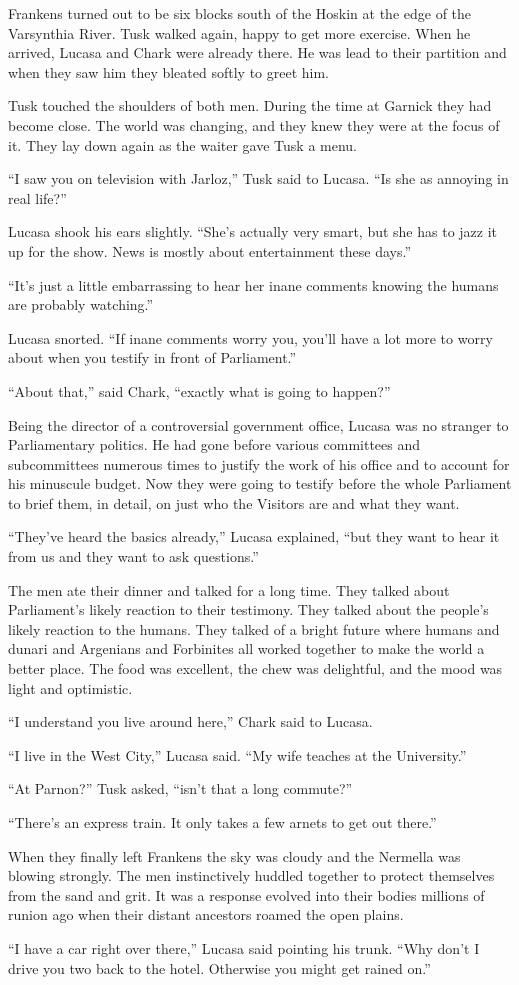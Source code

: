 Frankens turned out to be six blocks south of the Hoskin at the edge of the Varsynthia River.
Tusk walked again, happy to get more exercise. When he arrived, Lucasa and Chark were already
there. He was lead to their partition and when they saw him they bleated softly to greet him.

Tusk touched the shoulders of both men. During the time at Garnick they had become close. The
world was changing, and they knew they were at the focus of it. They lay down again as the
waiter gave Tusk a menu.

``I saw you on television with Jarloz,'' Tusk said to Lucasa. ``Is she as annoying in real
life?''

Lucasa shook his ears slightly. ``She's actually very smart, but she has to jazz it up for the
show. News is mostly about entertainment these days.''

``It's just a little embarrassing to hear her inane comments knowing the humans are probably
watching.''

Lucasa snorted. ``If inane comments worry you, you'll have a lot more to worry about when you
testify in front of Parliament.''

``About that,'' said Chark, ``exactly what is going to happen?''

Being the director of a controversial government office, Lucasa was no stranger to Parliamentary
politics. He had gone before various committees and subcommittees numerous times to justify the
work of his office and to account for his minuscule budget. Now they were going to testify
before the whole Parliament to brief them, in detail, on just who the Visitors are and what they
want.

``They've heard the basics already,'' Lucasa explained, ``but they want to hear it from us and
they want to ask questions.''

The men ate their dinner and talked for a long time. They talked about Parliament's likely
reaction to their testimony. They talked about the people's likely reaction to the humans. They
talked of a bright future where humans and dunari and Argenians and Forbinites all worked
together to make the world a better place. The food was excellent, the chew was delightful, and
the mood was light and optimistic.

``I understand you live around here,'' Chark said to Lucasa.

``I live in the West City,'' Lucasa said. ``My wife teaches at the University.''

``At Parnon?'' Tusk asked, ``isn't that a long commute?''

``There's an express train. It only takes a few arnets to get out there.''

When they finally left Frankens the sky was cloudy and the Nermella was blowing strongly. The
men instinctively huddled together to protect themselves from the sand and grit. It was a
response evolved into their bodies millions of runion ago when their distant ancestors roamed
the open plains.

``I have a car right over there,'' Lucasa said pointing his trunk. ``Why don't I drive you two
back to the hotel. Otherwise you might get rained on.''
